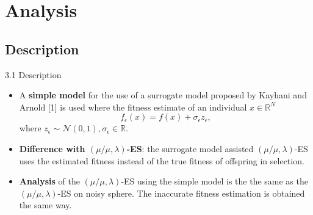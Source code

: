 \documentclass{beamer}
\begin{document}
\section{Analysis}
\subsection{Description}
\begin{frame}{3.1 Description}

\begin{itemize}
\item A \textbf{simple model} for the use of a surrogate model proposed by Kayhani and Arnold [1] is used where the fitness estimate of an individual $x\in \mathbb{R}^N$ $$f_\epsilon(x) = f(x)+\sigma_\epsilon z_\epsilon,$$
where $z_\epsilon \sim \mathcal{N}(0,1), \sigma_\epsilon \in \mathbb{R}. $

\item \textbf{Difference with $(\mu/\mu,\lambda)$-ES}: the surrogate model assisted $(\mu/\mu,\lambda)$-ES uses the estimated fitness instead of the true fitness of offspring in selection. 

\item \textbf{Analysis} of the $(\mu/\mu,\lambda)$-ES using the simple model is the the same as the $(\mu/\mu,\lambda)$-ES on noisy sphere. The inaccurate fitness estimation is obtained the same way.
\end{itemize}


\end{frame}



\end{document}
